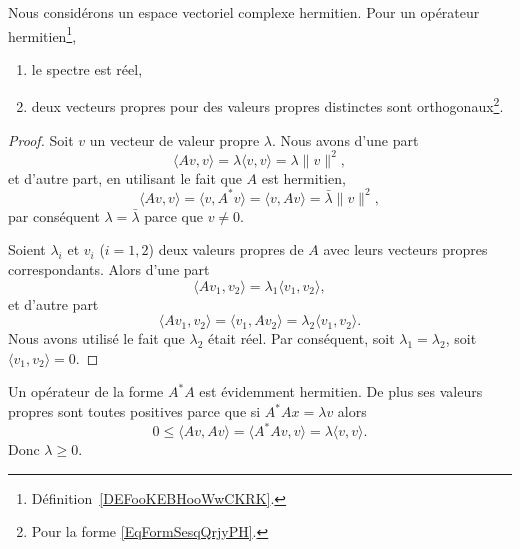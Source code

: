 \begin{lemma}      \label{LEMooVCEOooIXnTpp}
	Nous considérons un espace vectoriel complexe hermitien. Pour un opérateur hermitien\footnote{Définition~\ref{DEFooKEBHooWwCKRK}.},
	\begin{enumerate}
		\item
		      le spectre est réel,
		\item
		      deux vecteurs propres pour des valeurs propres distinctes sont orthogonaux\footnote{Pour la forme \eqref{EqFormSesqQrjyPH}.}.
	\end{enumerate}
\end{lemma}

\begin{proof}
	Soit \( v\) un vecteur de valeur propre \( \lambda\). Nous avons d'une part
	\begin{equation}
		\langle Av, v\rangle =\lambda\langle v, v\rangle =\lambda\| v \|^2,
	\end{equation}
	et d'autre part, en utilisant le fait que \( A\) est hermitien,
	\begin{equation}
		\langle Av, v\rangle =\langle v, A^*v\rangle =\langle v, Av\rangle =\bar\lambda\| v \|^2,
	\end{equation}
	par conséquent \( \lambda=\bar\lambda\) parce que \( v\neq 0\).

	Soient \( \lambda_i\) et \( v_i\) (\( i=1,2\)) deux valeurs propres de \( A\) avec leurs vecteurs propres correspondants. Alors d'une part
	\begin{equation}
		\langle Av_1, v_2\rangle =\lambda_1\langle v_1, v_2\rangle ,
	\end{equation}
	et d'autre part
	\begin{equation}
		\langle Av_1, v_2\rangle =\langle v_1, Av_2\rangle =\lambda_2\langle v_1, v_2\rangle .
	\end{equation}
	Nous avons utilisé le fait que \( \lambda_2\) était réel. Par conséquent, soit \( \lambda_1=\lambda_2\), soit \( \langle v_1, v_2\rangle =0\).
\end{proof}

\begin{remark}      \label{REMooMLBCooTuKFmz}
	Un opérateur de la forme \( A^*A\) est évidemment hermitien. De plus ses valeurs propres sont toutes positives parce que si \( A^*Ax=\lambda v\) alors
	\begin{equation}
		0\leq \langle Av, Av\rangle =\langle A^*Av, v\rangle =\lambda\langle v, v\rangle .
	\end{equation}
	Donc \( \lambda\geq 0\).
\end{remark}


